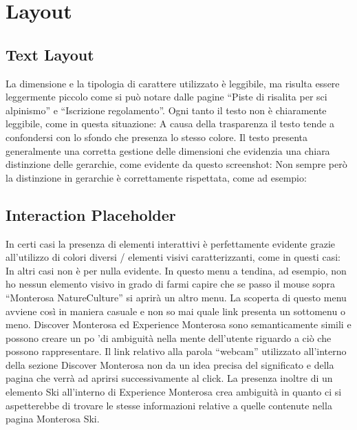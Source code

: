     \section{Layout}
        \subsection{Text Layout}
        La dimensione e la tipologia di carattere utilizzato è leggibile, ma
        risulta essere leggermente piccolo come si può notare  dalle pagine
        “Piste di risalita per sci alpinismo” e “Iscrizione regolamento”.
        Ogni tanto il testo non è chiaramente leggibile, come in questa
        situazione:
        A causa della trasparenza il testo tende a confondersi con lo sfondo che
        presenza lo stesso colore. Il testo presenta generalmente una corretta gestione delle
        dimensioni che evidenzia una chiara distinzione delle gerarchie, come
        evidente da questo screenshot:
        Non sempre però la distinzione in gerarchie è correttamente rispettata, come ad esempio:
        \subsection{Interaction Placeholder}
        In certi casi la presenza di elementi interattivi è perfettamente
        evidente grazie all’utilizzo di colori diversi / elementi visivi
        caratterizzanti, come in questi casi:
        In altri casi non è per nulla evidente.
        In questo menu a tendina, ad esempio, non ho nessun elemento visivo in
        grado di farmi capire che se passo il mouse sopra “Monterosa NatureCulture” si
        aprirà un altro menu. La scoperta di questo menu avviene così in maniera casuale
        e non so mai quale link presenta un sottomenu o meno.
        Discover Monterosa ed Experience Monterosa sono semanticamente simili e
        possono creare un po 'di ambiguità nella mente dell'utente riguardo a
        ciò che possono rappresentare.
        Il link relativo alla parola “webcam” utilizzato all'interno della
        sezione Discover Monterosa non da un idea precisa del significato e
        della pagina che verrà ad aprirsi successivamente al click. La presenza
        inoltre di un elemento Ski all'interno di Experience Monterosa crea
        ambiguità in quanto ci si aspetterebbe di trovare le stesse informazioni
        relative a quelle contenute nella pagina Monterosa Ski.

